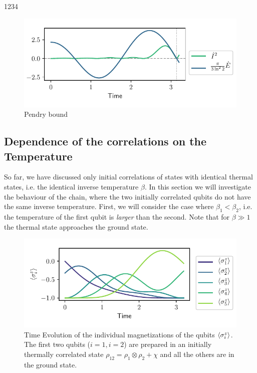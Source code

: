 \documentclass{book}
\numberwithin{equation}{section} %
\begin{document}
1234
\begin{figure}[h!]
    \centering
    \includegraphics{alltheplots/corr_at_diff_pos-new-alpha/45_pendry_grey_lines.pdf}
    \caption{Pendry bound \cite{BA_Pendry_1983}}
    \label{fig:corr45_pendry}
\end{figure}
\subsection{Dependence of the correlations on the Temperature}\label{sec:diff-beta}
So far, we have discussed only initial correlations of states with identical thermal states, i.e. the identical inverse temperature $\beta$.
In this section we will investigate the behaviour of the chain, where the two initially correlated qubits do not have the same inverse
temperature.
First, we will consider the case where $\beta_1 < \beta_2$, i.e. the temperature of the first qubit is \emph{larger} than the second.
Note that for $\beta \gg 1$ the thermal state approaches the ground state.
\begin{figure}[h!]
    \centering
    \includegraphics{alltheplots/diff_beta/beta1<beta2/12_expval_z.pdf}
    \caption{Time Evolution of the individual magnetizations of the qubits
    $\expval{\sigma^z_i}$.
    The first two qubits ($i=1, i=2$) are prepared in an initially thermally correlated state $\rho_{12} = \rho_1 \otimes \rho_2 + \chi$
    and all the others are in the ground state.}
    \label{fig:beta1_lt_beta2_corr12_expval_z}
\end{figure}\\
\end{document}
